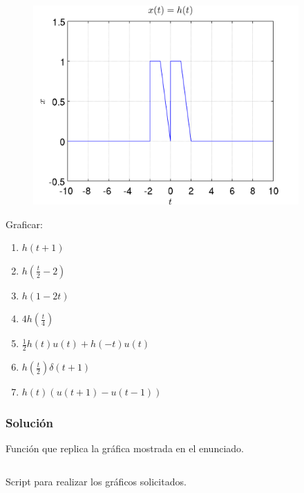 \documentclass[a4paper,12pt,final]{article}
\begin{document}
    \begin{figure}[H]
        \includegraphics[width=4in]{./laboratorio_2/problema07.png}
    \end{figure}

    \noindent Graficar:
    \begin{enumerate}
        \item $h\left(t+1\right)$
        \item $h\left(\frac{t}{2}-2\right)$
        \item $h\left(1-2t\right)$
        \item $4h\left(\frac{t}{4}\right)$
        \item $\frac{1}{2}h\left(t\right)u\left(t\right) + h\left(-t\right)u\left(t\right)$
        \item $h\left(\frac{t}{2}\right)\delta\left(t+1\right)$
        \item $h\left(t\right)\left(u\left(t+1\right)-u\left(t-1\right)\right)$
    \end{enumerate}

    \subsubsection*{Solución}
      \begin{listing}[H]
        \caption{Función que replica la gráfica mostrada en el enunciado.}
        \label{script07}
        \inputminted{matlab}{./laboratorio_2/hfun.m}
      \end{listing}
      \vspace{\fill}

      \newpage
      \begin{listing}[H]
        \caption{Script para realizar los gráficos solicitados.}
        \label{script07A}
        \inputminted[firstline=5]{matlab}{./laboratorio_2/problema07.m}
      \end{listing}
      \vspace{\fill}
\end{document}
